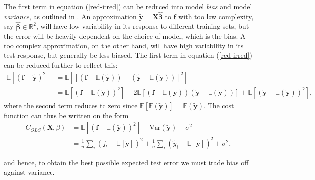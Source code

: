 \documentclass[]{article}
\begin{document}
The first term in equation (\ref{red-irred}) can be reduced into model \textit{bias} and model \textit{variance}, as outlined in \cite{friedman2001elements}. An approximation $\mathbf{\tilde{y}} = \mathbf{X\hat{\beta}}$ to $\mathbf{f}$ with too low complexity, say $\mathbf{\hat{\beta}} \in \mathbb{R}^2$, will have low variability in its response to different training sets, but the error will be heavily dependent on the choice of model, which is the bias. A too complex approximation, on the other hand, will have high variability in its test response, but generally be less biased. The first term in equation (\ref{red-irred}) can be reduced further to reflect this:
\begin{equation}
\begin{aligned}
\mathbb{E}[(\mathbf{f} - \mathbf{\tilde{y}})^2] &= \mathbb{E}[[(\mathbf{f} - \mathbb{E}(\mathbf{\tilde{y}})) - (\mathbf{\tilde{y}}- \mathbb{E}(\mathbf{\tilde{y}}))]^2] \\ 
&= \mathbb{E}[(\mathbf{f} - \mathbb{E}(\mathbf{\tilde{y}}))^2] - 2\mathbb{E}[(\mathbf{f} - \mathbb{E}(\mathbf{\tilde{y}}))(\mathbf{\tilde{y}}- \mathbb{E}(\mathbf{\tilde{y}}))] + \mathbb{E}[(\mathbf{\tilde{y}}- \mathbb{E}(\mathbf{\tilde{y}}))^2],
\end{aligned}
\end{equation}
where the second term reduces to zero since $\mathbb{E}[\mathbb{E}(\mathbf{\tilde{y}})] = \mathbb{E}(\mathbf{\tilde{y}})$. The cost function can thus be written on the form
\begin{equation}
\begin{aligned}
\label{bias-variance}
C_{OLS}(\mathbf{X},\mathbb{\beta}) &= \mathbb{E}[(\mathbf{f} - \mathbb{E}(\mathbf{\tilde{y}}))^2] + \mathrm{Var}(\mathbf{\tilde{y}}) + \sigma^2 \\
&=\frac{1}{n}\sum_i(f_i-\mathbb{E}\left[\boldsymbol{\tilde{y}}\right])^2+\frac{1}{n}\sum_i(\tilde{y}_i-\mathbb{E}\left[\boldsymbol{\tilde{y}}\right])^2+\sigma^2,
\end{aligned}
\end{equation}

and hence, to obtain the best possible expected test error we must trade bias off against variance.
\end{document}
